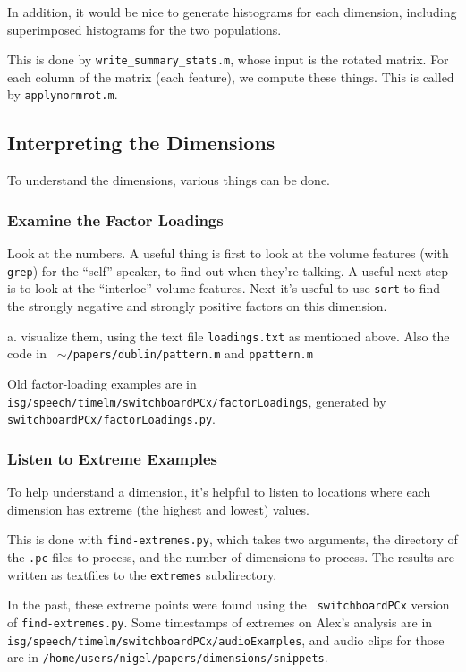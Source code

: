 \documentclass[11pt]{article}
\begin{document}
In addition, it would be nice to generate histograms for each
dimension, including superimposed histograms for the two populations.

This is done by {\tt write\_summary\_stats.m}, whose input is the
rotated matrix.  For each column of the matrix (each feature), we
compute these things.  This is called by {\tt applynormrot.m}.

\subsection{Interpreting the Dimensions}

To understand the dimensions, various things can be done.

\subsubsection{Examine the Factor Loadings}

Look at the numbers.  A useful thing is first to look at the volume
features (with {\tt grep}) for the ``self'' speaker, to find out when
they're talking.  A useful next step is to look at the ``interloc''
volume features.  Next it's useful to use {\tt sort} to find the 
strongly negative and strongly positive factors on this dimension. 

  a. visualize them, using the text file {\tt loadings.txt} as
  mentioned above.  Also the code in {\tt
    $\sim$/papers/dublin/pattern.m} and {\tt ppattern.m}


Old factor-loading examples are in {\tt
  isg/speech/timelm/switchboardPCx/factorLoadings}, generated by
{\tt switchboardPCx/factorLoadings.py}.


\subsubsection{Listen to Extreme Examples}

To help understand a dimension, it's helpful to listen to locations
where each dimension has extreme (the highest and lowest) values.

This is done with {\tt find-extremes.py}, which takes two arguments,
the directory of the {\tt .pc} files to process, and the number of
dimensions to process.  The results are written as textfiles to the
{\tt extremes} subdirectory.

In the past, these extreme points were found using the {\tt
  switchboardPCx} version of {\tt find-extremes.py}.  Some timestamps
of extremes on Alex's analysis are in {\tt
  isg/speech/timelm/switchboardPCx/audioExamples}, and audio clips for
those are in {\tt /home/users/nigel/papers/dimensions/snippets}.
\end{document}
